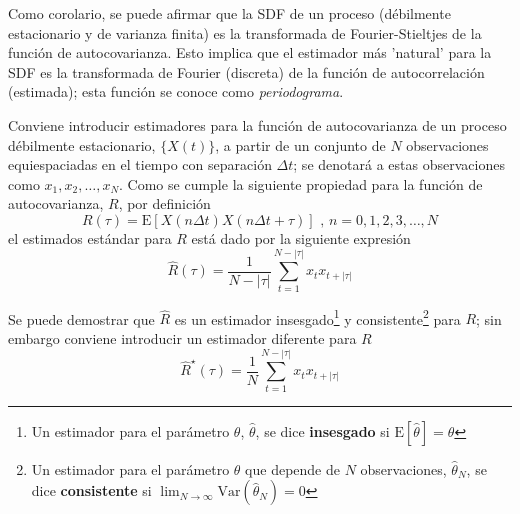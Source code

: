 \documentclass[12pt,a4paper]{mitthesis}
\newcommand{\aste}[1]{\widehat{ #1 }^{\star}}
\newcommand{\E}[1]{\mathrm{E}\left[ #1 \right]}
\newcommand{\Var}[1]{\mathrm{Var}\left( #1 \right)}
\newcommand{\abso}[1]{\left| #1 \right|}
\begin{document}
Como corolario, se puede afirmar que la SDF de un proceso (d\'ebilmente estacionario y de varianza
finita) es la transformada de Fourier-Stieltjes de la funci\'on de autocovarianza.
Esto implica que el estimador m\'as 'natural' para la SDF es la transformada de Fourier (discreta) 
de la funci\'on de autocorrelaci\'on (estimada); esta funci\'on se conoce como 
\textit{periodograma}. 


Conviene introducir estimadores para la funci\'on de autocovarianza de un proceso d\'ebilmente 
estacionario, $\{ X(t) \}$, a partir de un conjunto de $N$ observaciones equiespaciadas en el 
tiempo con separaci\'on $\Delta t$; se denotar\'a a estas observaciones como 
$x_1, x_2 , \dots, x_N$. Como se cumple la siguiente propiedad para la funci\'on de autocovarianza, 
$R$, por definici\'on
\begin{equation*}
R(\tau) = \E{X(n\Delta t)X(n\Delta t + \tau)} \text{  ,  } n = 0, 1, 2,  3,\dots, N
\end{equation*}
el estimados est\'andar para $R$ est\'a dado por la siguiente expresi\'on
\begin{equation*}
\widehat{R}(\tau) = \frac{1}{N-\abso{\tau}} 
\sum_{t = 1}^{N-\abso{\tau}} x_t x_{t+\abso{\tau}}
\label{estimador_R}
\end{equation*}

Se puede demostrar que $\widehat{R}$ es un estimador 
insesgado\footnote{Un estimador para el par\'ametro $\theta$, $\widehat{\theta}$, se dice 
\textbf{insesgado} si $\E{\widehat{\theta}}=\theta$} 
y consistente\footnote{Un estimador para el par\'ametro $\theta$ que depende de $N$ observaciones, 
$\widehat{\theta}_N$, se dice \textbf{consistente} si 
$\lim_{N\rightarrow \infty} \Var{\widehat{\theta}_N} = 0$} 
para $R$; sin embargo conviene introducir un estimador diferente para $R$
\begin{equation*}
\aste{R}(\tau) = \frac{1}{N} 
\sum_{t = 1}^{N-\abso{\tau}} x_t x_{t+\abso{\tau}}
\label{estimador_R_ast}
\end{equation*}
\end{document}
